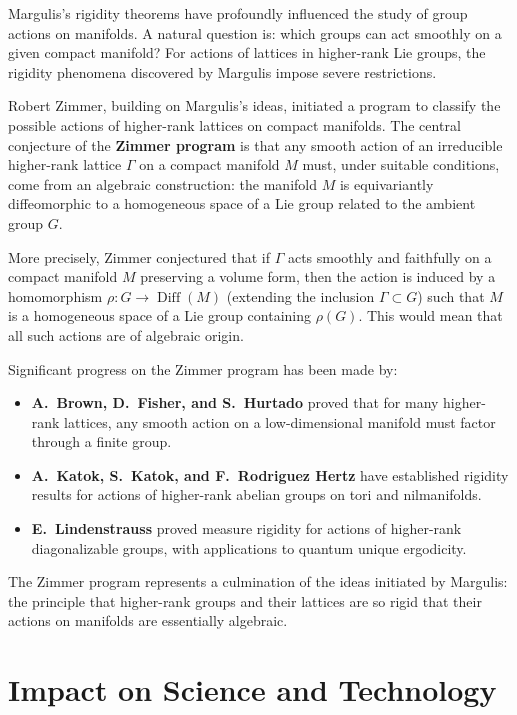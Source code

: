 Margulis's rigidity theorems have profoundly influenced the study of group actions on manifolds. A natural question is: which groups can act smoothly on a given compact manifold? For actions of lattices in higher-rank Lie groups, the rigidity phenomena discovered by Margulis impose severe restrictions.

Robert Zimmer, building on Margulis's ideas, initiated a program to classify the possible actions of higher-rank lattices on compact manifolds. The central conjecture of the \textbf{Zimmer program} is that any smooth action of an irreducible higher-rank lattice \(\Gamma\) on a compact manifold \(M\) must, under suitable conditions, come from an algebraic construction: the manifold \(M\) is equivariantly diffeomorphic to a homogeneous space of a Lie group related to the ambient group \(G\).

More precisely, Zimmer conjectured that if \(\Gamma\) acts smoothly and faithfully on a compact manifold \(M\) preserving a volume form, then the action is induced by a homomorphism \(\rho: G \to \operatorname{Diff}(M)\) (extending the inclusion \(\Gamma \subset G\)) such that \(M\) is a homogeneous space of a Lie group containing \(\rho(G)\). This would mean that all such actions are of algebraic origin.

Significant progress on the Zimmer program has been made by:
\begin{itemize}
    \item \textbf{A.\ Brown, D.\ Fisher, and S.\ Hurtado} proved that for many higher-rank lattices, any smooth action on a low-dimensional manifold must factor through a finite group.
    \item \textbf{A.\ Katok, S.\ Katok, and F.\ Rodriguez Hertz} have established rigidity results for actions of higher-rank abelian groups on tori and nilmanifolds.
    \item \textbf{E.\ Lindenstrauss} proved measure rigidity for actions of higher-rank diagonalizable groups, with applications to quantum unique ergodicity.
\end{itemize}

The Zimmer program represents a culmination of the ideas initiated by Margulis: the principle that higher-rank groups and their lattices are so rigid that their actions on manifolds are essentially algebraic.

\section{Impact on Science and Technology}

